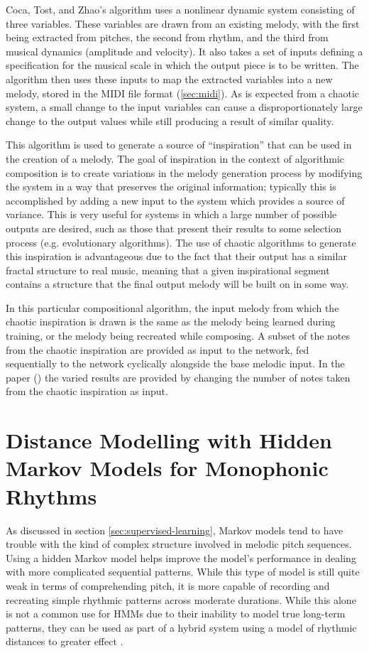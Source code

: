 \documentclass[ author={Stephen Livermore-Tozer},
				supervisor={Dr. Peter Flach},
				degree={MEng},
				title={Performing Algorithmic Co-composition Using Machine Learning},
				subtitle={},
				type={research},
				year={2016} ]{dissertation}
\begin{document}
	Coca, Tost, and Zhao's algorithm uses a nonlinear dynamic system consisting of three variables. These variables are drawn from an existing melody, with the first being extracted from pitches, the second from rhythm, and the third from musical dynamics (amplitude and velocity). It also takes a set of inputs defining a specification for the musical scale in which the output piece is to be written. The algorithm then uses these inputs to map the extracted variables into a new melody, stored in the MIDI file format (\ref{sec:midi}). As is expected from a chaotic system, a small change to the input variables can cause a disproportionately large change to the output values while still producing a result of similar quality.
	
	This algorithm is used to generate a source of ``inspiration'' that can be used in the creation of a melody. The goal of inspiration in the context of algorithmic composition is to create variations in the melody generation process by modifying the system in a way that preserves the original information; typically this is accomplished by adding a new input to the system which provides a source of variance. This is very useful for systems in which a large number of possible outputs are desired, such as those that present their results to some selection process (e.g. evolutionary algorithms). The use of chaotic algorithms to generate this inspiration is advantageous due to the fact that their output has a similar fractal structure to real music, meaning that a given inspirational segment contains a structure that the final output melody will be built on in some way.
	
	In this particular compositional algorithm, the input melody from which the chaotic inspiration is drawn is the same as the melody being learned during training, or the melody being recreated while composing. A subset of the notes from the chaotic inspiration are provided as input to the network, fed sequentially to the network cyclically alongside the base melodic input. In the paper (\cite{coca2011generation}) the varied results are provided by changing the number of notes taken from the chaotic inspiration as input.
	
	\section{Distance Modelling with Hidden Markov Models for Monophonic Rhythms}
	\label{sec:distance-model}
	
	As discussed in section \ref{sec:supervised-learning}, Markov models tend to have trouble with the kind of complex structure involved in melodic pitch sequences. Using a hidden Markov model helps improve the model's performance in dealing with more complicated sequential patterns. While this type of model is still quite weak in terms of comprehending pitch, it is more capable of recording and recreating simple rhythmic patterns across moderate durations. While this alone is not a common use for HMMs due to their inability to model true long-term patterns, they can be used as part of a hybrid system using a model of rhythmic distances to greater effect \cite{paiement2007generative}.
	
\end{document}
